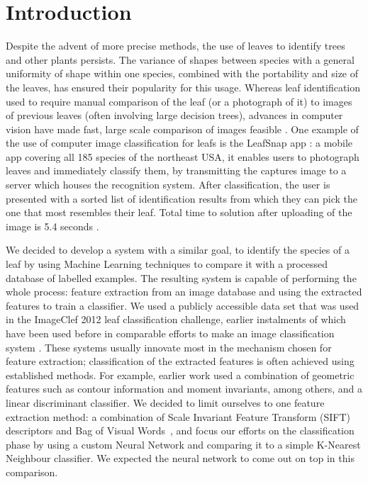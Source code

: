 \section{Introduction}
Despite the advent of more precise methods, the use of leaves to identify trees and other plants persists. The variance of shapes between species with a general uniformity of shape within one species, combined with the portability and size of the leaves, has ensured their popularity for this usage. 
Whereas leaf identification used to require manual comparison of the leaf (or a photograph of it) to images of previous leaves (often involving large decision trees), advances in computer vision have made fast, large scale comparison of images feasible \cite{Belh2008}. One example of the use of computer image classification for leafs is the LeafSnap app \cite{Kuma2012}: a mobile app covering all 185 species of the northeast USA, it enables users to photograph leaves and immediately classify them, by transmitting the captures image to a server which houses the recognition system. After classification, the user is presented with a sorted list of identification results from which they can pick the one that most resembles their leaf. Total time to solution after uploading of the image is 5.4 seconds \cite{Kuma2012}.

We decided to develop a system with a similar goal, to identify the species of a leaf by using Machine Learning techniques to compare it with a processed database of labelled examples. The resulting system is capable of performing the whole process: feature extraction from an image database and using the extracted features to train a classifier. We used a publicly accessible data set that was used in the ImageClef 2012 leaf classification challenge, earlier instalments of which have been used before in comparable efforts to make an image classification system \cite{Goea2011}. These systems usually innovate most in the mechanism chosen for feature extraction; classification of the extracted features is often achieved using established methods. For example, earlier work \cite{Kaly2015} used a combination of geometric features such as contour information and moment invariants, among others, and a linear discriminant classifier.
We decided to limit ourselves to one feature extraction method: a combination of Scale Invariant Feature Transform (SIFT) descriptors and Bag of Visual Words~\cite{Zhan2010}, and focus our efforts on the classification phase by using a custom Neural Network and comparing it to a simple K-Nearest Neighbour classifier.
We expected the neural network to come out on top in this comparison.

